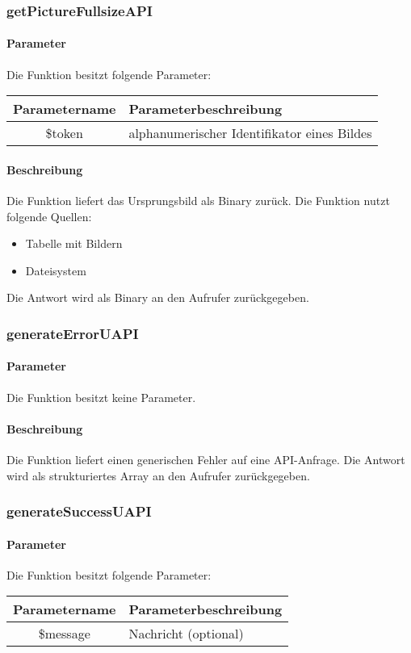 \subsubsection{getPictureFullsizeAPI}
\paragraph{Parameter} Die Funktion besitzt folgende Parameter:
\begin{table}[H]
	\begin{tabular}{|c|p{11cm}|}
		\hline
		\textbf{Parametername} & \textbf{Parameterbeschreibung} \\ \hline
		\$token & alphanumerischer Identifikator eines Bildes \\ \hline
	\end{tabular}
\end{table}
\paragraph{Beschreibung} Die Funktion liefert das Ursprungsbild als Binary zurück. Die Funktion nutzt folgende Quellen:
\begin{itemize}
	\item Tabelle mit Bildern
	\item Dateisystem
\end{itemize}
Die Antwort wird als Binary an den Aufrufer zurückgegeben.
\subsubsection{generateErrorUAPI}
\paragraph{Parameter} Die Funktion besitzt keine Parameter.
\paragraph{Beschreibung} Die Funktion liefert einen generischen Fehler auf eine API-Anfrage. Die Antwort wird als strukturiertes Array an den Aufrufer zurückgegeben.
\subsubsection{generateSuccessUAPI}
\paragraph{Parameter} Die Funktion besitzt folgende Parameter:
\begin{table}[H]
	\begin{tabular}{|c|p{11cm}|}
		\hline
		\textbf{Parametername} & \textbf{Parameterbeschreibung} \\ \hline
		\$message & Nachricht (optional) \\ \hline
	\end{tabular}
\end{table}

